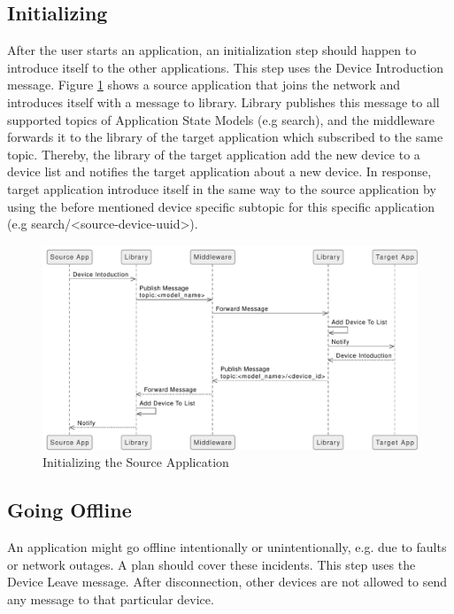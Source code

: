 \subsection{Initializing}
After the user starts an application, an initialization step should happen to introduce itself to the other applications. This step uses the Device Introduction message. Figure \ref{fig:Initializing} shows a source application that joins the network and introduces itself with a message to library. Library publishes this message to all supported topics of Application State Models (e.g search), and the middleware forwards it to the library of the target application which subscribed to the same topic. Thereby, the library of the target application add the new device to a device list and notifies the target application about a new device. In response, target application introduce itself in the same way to the source application by using the before mentioned device specific subtopic for this specific application (e.g search/<source-device-uuid>).


\FloatBarrier \begin{figure}[H]
    \includegraphics[width=\linewidth]{../figures/Initializing.pdf}
    \centering
    \caption{Initializing the Source Application}
    \label{fig:Initializing}
\end{figure} \FloatBarrier

\subsection{Going Offline}
An application might go offline intentionally or unintentionally, e.g. due to faults or network outages. A plan should cover these incidents. This step uses the Device Leave message. After disconnection, other devices are not allowed to send any message to that particular device.

